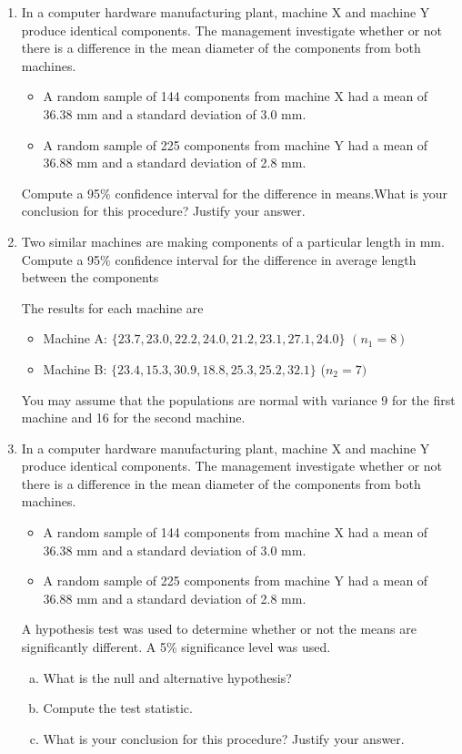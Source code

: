 \documentclass[]{article}
\begin{document}
\begin{enumerate}
\item 
In a computer hardware manufacturing plant, machine X and machine Y
produce identical components. The management investigate whether or
not there is a difference in the mean diameter of the components from
both machines.
\begin{itemize}
\item A random sample of 144 components from machine X had a mean of
36.38 mm and a standard deviation of 3.0 mm.
\item  A random sample of 225 components from machine Y had a mean of
36.88 mm and a standard deviation of 2.8 mm.
\end{itemize}
Compute a 95\% confidence interval for the difference in means.What is your conclusion for this procedure? Justify your
answer.
\item Two similar machines are making components of a particular length in mm.
Compute a 95\% confidence interval for the difference in average length between the components

The results for each machine are
\begin{itemize}
\item Machine A: $\{23.7, 23.0, 22.2, 24.0, 21.2, 23.1, 27.1, 24.0\}$ $(n_1 = 8)$
\item Machine B: $\{23.4, 15.3, 30.9, 18.8, 25.3, 25.2, 32.1\}$ ($n_2 = 7)$
\end{itemize}

You may assume that the populations are normal with variance 9 for the first machine and 16 for
the second machine.

\item 
In a computer hardware manufacturing plant, machine X and machine Y
produce identical components. The management investigate whether or
not there is a difference in the mean diameter of the components from
both machines.
\begin{itemize}
\item A random sample of 144 components from machine X had a mean of
36.38 mm and a standard deviation of 3.0 mm.
\item  A random sample of 225 components from machine Y had a mean of
36.88 mm and a standard deviation of 2.8 mm.
\end{itemize}
A hypothesis test was used to determine whether or not the means are
significantly different. A 5\% significance level was used.
\begin{enumerate}[(a)]
\item What is the null and alternative hypothesis?
\item Compute the test statistic.
\item What is your conclusion for this procedure? Justify your
answer.
\end{enumerate}


\end{enumerate}
\end{document}
